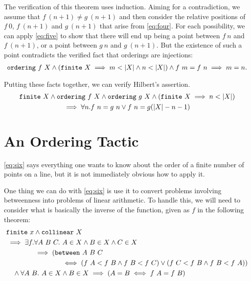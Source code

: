 The verification of this theorem uses induction. Aiming for a contradiction, we assume that $f\ (n+1) \neq g\ (n+1)$ and then consider the relative positions of $f\ 0$, $f\ (n+1)$ and $g\ (n+1)$ that arise from \ref{eq:four}. For each possibility, we can apply \ref{eq:five} to show that there will end up being a point between $f\ n$ and $f\ (n+1)$, or a point between $g\ n$ and $g\ (n+1)$. But the existence of such a point contradicts the verified fact that orderings are injections:
\begin{multline}
  \texttt{ordering}\ f\ X \wedge (\texttt{finite}\ X \implies m < |X| \wedge n < |X|) \wedge f\ m = f\ n \implies m=n.
\end{multline}

Putting these facts together, we can verify Hilbert's assertion.
\begin{multline}
  \texttt{finite}\ X \wedge \texttt{ordering}\ f\ X \wedge \texttt{ordering}\ g\ X \wedge (\texttt{finite}\ X \implies n < |X|)\\
  \implies \forall n. f\ n = g\ n \vee f\ n = g (|X| - n - 1)
\end{multline}

\section{An Ordering Tactic}
\ref{eq:six} says everything one wants to know about the order of a finite number of points on a line, but it is not immediately obvious how to apply it.

One thing we can do with \ref{eq:six} is use it to convert problems involving betweenness into problems of linear arithmetic. To handle this, we will need to consider what is basically the inverse of the  function, given as $f$ in the following theorem:
\begin{equation}
\label{eq:OrderInverse}
\begin{split}
  &\texttt{finite}\ x \wedge \texttt{collinear}\ X\\
  &\implies \exists f. \forall A\ B\ C.\ A \in X \wedge B \in X \wedge C \in X \\
  &\qquad\qquad\implies (\texttt{between}\ A\ B\ C \\
  &\qquad\qquad\qquad\qquad\iff (f\ A < f\ B \wedge f\ B < f\ C) \vee (f\ C < f\ B \wedge f\ B < f\ A))\\
  &\quad\wedge \forall A\ B.\ A \in X \wedge B \in X \implies (A = B \iff f\ A = f\ B)
\end{split}
\end{equation}

